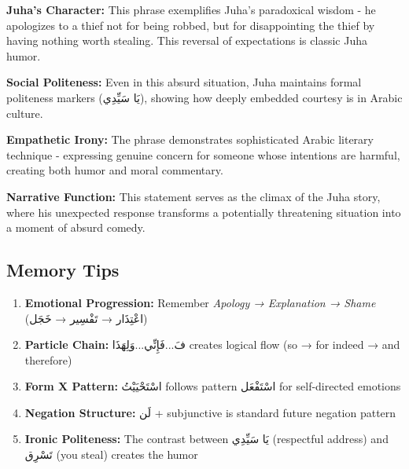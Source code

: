 \documentclass[letterpaper,12pt]{article}
\begin{document}
\begin{tcolorbox}[colback=boxcolor,colframe=accentcolor,title=\textbf{Cultural and Literary Context},breakable]
\textbf{Juha's Character:} This phrase exemplifies Juha's paradoxical wisdom - he apologizes to a thief not for being robbed, but for disappointing the thief by having nothing worth stealing. This reversal of expectations is classic Juha humor.

\textbf{Social Politeness:} Even in this absurd situation, Juha maintains formal politeness markers (\textarabic{يَا سَيِّدِي}), showing how deeply embedded courtesy is in Arabic culture.

\textbf{Empathetic Irony:} The phrase demonstrates sophisticated Arabic literary technique - expressing genuine concern for someone whose intentions are harmful, creating both humor and moral commentary.

\textbf{Narrative Function:} This statement serves as the climax of the Juha story, where his unexpected response transforms a potentially threatening situation into a moment of absurd comedy.
\end{tcolorbox}

\subsection{Memory Tips}
\begin{enumerate}
\item \textbf{Emotional Progression:} Remember \textit{Apology → Explanation → Shame} (\textarabic{اعْتِذَار} →  \textarabic{تَفْسِير} → \textarabic{خَجَل})
\item \textbf{Particle Chain:} \textarabic{فَ...فَإِنِّي...وَلِهَذَا} creates logical flow (so → for indeed → and therefore)
\item \textbf{Form X Pattern:} \textarabic{اسْتَحْيَيْتُ} follows pattern \textarabic{اسْتَفْعَل} for self-directed emotions
\item \textbf{Negation Structure:} \textarabic{لَن + subjunctive} is standard future negation pattern
\item \textbf{Ironic Politeness:} The contrast between \textarabic{يَا سَيِّدِي} (respectful address) and \textarabic{تَسْرِق} (you steal) creates the humor
\end{enumerate}
\end{document}
